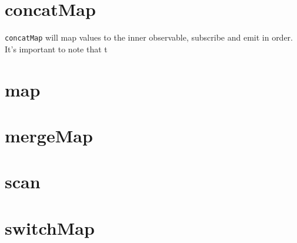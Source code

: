 \section{concatMap}
\lstinline{concatMap} will map values to the inner observable, subscribe and 
emit in order. It's important to note that t

\section{map} 

\section{mergeMap}

\section{scan}

\section{switchMap}